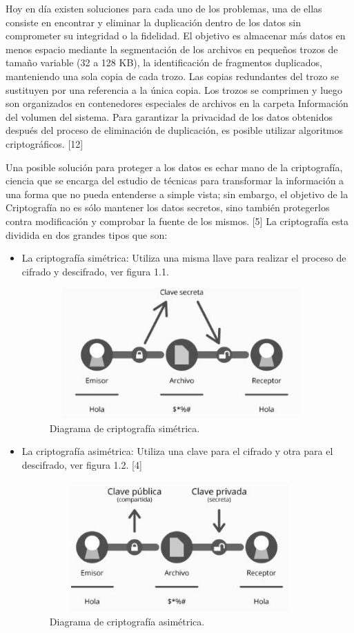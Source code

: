 Hoy en día existen soluciones para cada uno de los problemas, una de ellas consiste en encontrar y eliminar la duplicación dentro de los datos sin comprometer su integridad o la fidelidad. El objetivo es almacenar más datos en menos espacio mediante la segmentación de los archivos en pequeños trozos de tamaño variable (32 a 128 KB), la identificación de fragmentos duplicados, manteniendo una sola copia de cada trozo. Las copias redundantes del trozo se sustituyen por una referencia a la única copia. Los trozos se comprimen y luego son organizados en contenedores especiales de archivos en la carpeta Información del volumen del sistema. Para garantizar la privacidad de los datos obtenidos después del proceso de eliminación de duplicación, es posible utilizar algoritmos criptográficos. [12]

Una posible solución para proteger a los datos es echar mano de la criptografía, ciencia que se encarga del estudio de técnicas para transformar la información a una forma que no pueda entenderse a simple vista; sin embargo, el objetivo de la Criptografía no es sólo mantener los datos secretos, sino también protegerlos contra modificación y comprobar la fuente de los mismos. [5] La criptografía esta dividida en dos grandes tipos que son:

\begin{itemize}
	\item La criptografía simétrica: Utiliza una misma llave para realizar el proceso de cifrado y descifrado, ver figura 1.1.
		\begin{figure}[H]
			\centering
			\includegraphics[width=10cm, height=5cm]{./images/Cripto_Simetrica.jpg}
			\caption{Diagrama de criptografía simétrica.}
		\end{figure}
	\item La criptografía asimétrica: Utiliza una clave para el cifrado y otra para el descifrado, ver figura 1.2. [4]
		\begin{figure}[H]
			\centering
			\includegraphics[width=10cm, height=5cm]{./images/Cripto_Asimetrica.jpg}
			\caption{Diagrama de criptografía asimétrica.}
		\end{figure}
\end{itemize}


